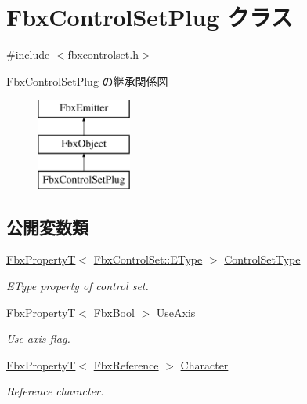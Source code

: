 \hypertarget{class_fbx_control_set_plug}{}\section{Fbx\+Control\+Set\+Plug クラス}
\label{class_fbx_control_set_plug}


{\ttfamily \#include $<$fbxcontrolset.\+h$>$}

Fbx\+Control\+Set\+Plug の継承関係図\begin{figure}[H]
\begin{center}
\leavevmode
\includegraphics[height=3.000000cm]{class_fbx_control_set_plug}
\end{center}
\end{figure}
\subsection*{公開変数類}
\begin{DoxyCompactItemize}
\item 
\hyperlink{class_fbx_property_t}{Fbx\+PropertyT}$<$ \hyperlink{class_fbx_control_set_a13a51702c46fff33d50c05d20f3d9f04}{Fbx\+Control\+Set\+::\+E\+Type} $>$ \hyperlink{class_fbx_control_set_plug_ac721dfc2da9b51b8a90c1df5f679e496}{Control\+Set\+Type}
\begin{DoxyCompactList}\small\item\em E\+Type property of control set. \end{DoxyCompactList}\item 
\hyperlink{class_fbx_property_t}{Fbx\+PropertyT}$<$ \hyperlink{fbxtypes_8h_a92e0562b2fe33e76a242f498b362262e}{Fbx\+Bool} $>$ \hyperlink{class_fbx_control_set_plug_a037aaf41be834256757d7bf874d7531b}{Use\+Axis}
\begin{DoxyCompactList}\small\item\em Use axis flag. \end{DoxyCompactList}\item 
\hyperlink{class_fbx_property_t}{Fbx\+PropertyT}$<$ \hyperlink{fbxtypes_8h_a44df6a2eec915cf27cd481e5c5e48a24}{Fbx\+Reference} $>$ \hyperlink{class_fbx_control_set_plug_ab6b2b323fb163f6c57121ff755fda602}{Character}
\begin{DoxyCompactList}\small\item\em Reference character. \end{DoxyCompactList}\end{DoxyCompactItemize}
